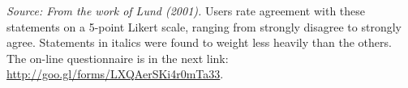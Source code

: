 \textit{Source: From the work of Lund (2001).} Users rate agreement
with these statements on a 5-point Likert scale, ranging from strongly
disagree to strongly agree. Statements in italics were found to weight
less heavily than the others.\\  The on-line questionnaire is in the
next link: \url{http://goo.gl/forms/LXQAerSKi4r0mTa33}.

